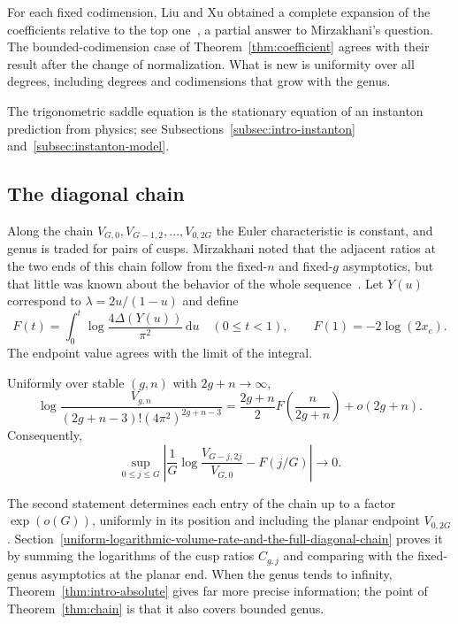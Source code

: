 For each fixed codimension, Liu and Xu obtained a complete expansion of the coefficients relative to the top one~\cite[Theorem~1.2]{LX}, a partial answer to Mirzakhani's question. The bounded-codimension case of Theorem~\ref{thm:coefficient} agrees with their result after the change of normalization. What is new is uniformity over all degrees, including degrees and codimensions that grow with the genus.

The trigonometric saddle equation is the stationary equation of an instanton prediction from physics; see Subsections~\ref{subsec:intro-instanton} and~\ref{subsec:instanton-model}.

\subsection{The diagonal chain}
Along the chain $V_{G,0},V_{G-1,2},\ldots,V_{0,2G}$ the Euler characteristic is constant, and genus is traded for pairs of cusps. Mirzakhani noted that the adjacent ratios at the two ends of this chain follow from the fixed-$n$ and fixed-$g$ asymptotics, but that little was known about the behavior of the whole sequence~\cite[Section~1.4]{Mir}. Let $Y(u)$ correspond to $\lambda=2u/(1-u)$ and define
\begin{equation}
 F(t)=\int_0^t\log\frac{4\Delta(Y(u))}{\pi^2}\,\mathrm{d}u
 \quad(0\le t<1),\qquad F(1)=-2\log(2x_c).
 \label{eq:WC1}
\end{equation}
The endpoint value agrees with the limit of the integral.
\begin{mainresult}
\begin{theorem}\label{thm:chain}
Uniformly over stable $(g,n)$ with $2g+n\to\infty$,
\begin{equation}
 \log\frac{V_{g,n}}{(2g+n-3)!(4\pi^2)^{2g+n-3}}
 =\frac{2g+n}{2}F\!\left(\frac n{2g+n}\right)+o(2g+n).
 \label{eq:WC2}
\end{equation}
Consequently,
\begin{equation}
 \sup_{0\le j\le G}
 \left|\frac1G\log\frac{V_{G-j,2j}}{V_{G,0}}-F(j/G)\right|\to0.
 \label{eq:WC3}
\end{equation}
\end{theorem}
\end{mainresult}
The second statement determines each entry of the chain up to a factor $\exp(o(G))$, uniformly in its position and including the planar endpoint $V_{0,2G}$. Section~\ref{uniform-logarithmic-volume-rate-and-the-full-diagonal-chain} proves it by summing the logarithms of the cusp ratios $C_{g,j}$ and comparing with the fixed-genus asymptotics at the planar end. When the genus tends to infinity, Theorem~\ref{thm:intro-absolute} gives far more precise information; the point of Theorem~\ref{thm:chain} is that it also covers bounded genus.

